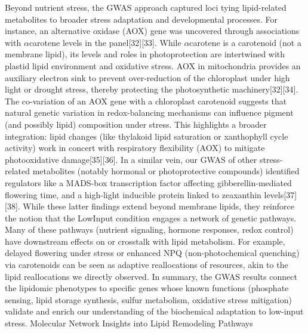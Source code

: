 \documentclass[10pt,letterpaper]{article}
\begin{document}
Beyond nutrient stress, the GWAS approach captured loci tying lipid-related metabolites to broader stress adaptation and developmental processes. For instance, an alternative oxidase (AOX) gene was uncovered through associations with $\alpha$\-carotene levels in the panel[32][33]. While $\alpha$\-carotene is a carotenoid (not a membrane lipid), its levels and roles in photoprotection are intertwined with plastid lipid environment and oxidative stress. AOX in mitochondria provides an auxiliary electron sink to prevent over-reduction of the chloroplast under high light or drought stress, thereby protecting the photosynthetic machinery[32][34]. The co-variation of an AOX gene with a chloroplast carotenoid suggests that natural genetic variation in redox-balancing mechanisms can influence pigment (and possibly lipid) composition under stress. This highlights a broader integration: lipid changes (like thylakoid lipid saturation or xanthophyll cycle activity) work in concert with respiratory flexibility (AOX) to mitigate photooxidative damage[35][36]. In a similar vein, our GWAS of other stress-related metabolites (notably hormonal or photoprotective compounds) identified regulators like a MADS-box transcription factor affecting gibberellin-mediated flowering time, and a high-light inducible protein linked to zeaxanthin levels[37][38]. While these latter findings extend beyond membrane lipids, they reinforce the notion that the LowInput condition engages a network of genetic pathways. Many of these pathways (nutrient signaling, hormone responses, redox control) have downstream effects on or crosstalk with lipid metabolism. For example, delayed flowering under stress or enhanced NPQ (non-photochemical quenching) via carotenoids can be seen as adaptive reallocations of resources, akin to the lipid reallocations we directly observed. In summary, the GWAS results connect the lipidomic phenotypes to specific genes whose known functions (phosphate sensing, lipid storage synthesis, sulfur metabolism, oxidative stress mitigation) validate and enrich our understanding of the biochemical adaptation to low-input stress.
Molecular Network Insights into Lipid Remodeling Pathways
\end{document}
